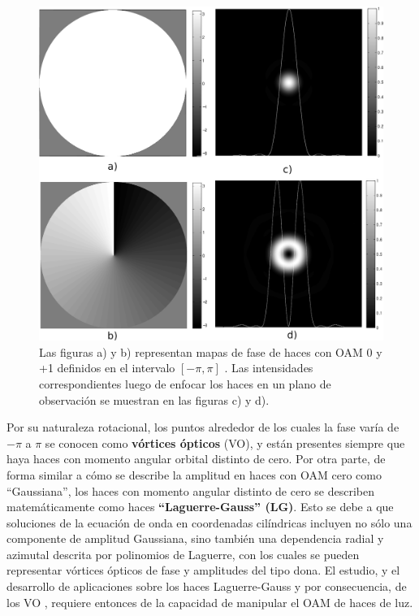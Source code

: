 \begin{figure}[h!]
\centering
\includegraphics[scale=.33]{oam_Intro}
\caption[Comparación entre haces Gaussianos y haces Laguerre-Gauss]{ Las figuras a) y b) representan mapas de fase de haces con
  OAM 0 y +1 definidos en el intervalo $[- 
  \pi,\pi]$ . Las intensidades correspondientes luego de enfocar los haces en
  un plano de observación se muestran en las figuras c) y d).}
\label{fig:oam_intro}
\end{figure}

Por su naturaleza rotacional, los puntos alrededor de los cuales la fase
varía de $-\pi$  a $\pi$ se conocen como \textbf{vórtices ópticos} (VO), y
están presentes siempre que haya haces con momento angular 
orbital distinto de cero. Por otra parte, de forma similar a cómo se
describe la amplitud en haces con OAM cero como ``Gaussiana'', 
los haces con momento angular distinto de cero se describen
matemáticamente como haces \textbf{``Laguerre-Gauss'' (LG)}. Esto se debe a que
soluciones de la ecuación de onda en coordenadas
cilíndricas incluyen no sólo una componente de amplitud Gaussiana, sino
también una dependencia radial y azimutal descrita por polinomios de
Laguerre, con los cuales se pueden representar vórtices ópticos de fase
y amplitudes del tipo dona.       
El estudio, y el desarrollo de aplicaciones sobre los haces Laguerre-Gauss y por consecuencia, de los VO , requiere entonces de la
capacidad de manipular el OAM de haces de luz.\\




